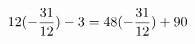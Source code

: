 \documentclass[preview]{standalone}
\begin{document}
\begin{align*}
\special{dvisvgm:raw <g id='unique000'>}12(- \frac{31}{12}) - 3 = 48(- \frac{31}{12}) + 90\special{dvisvgm:raw </g>}
\end{align*}
\end{document}
